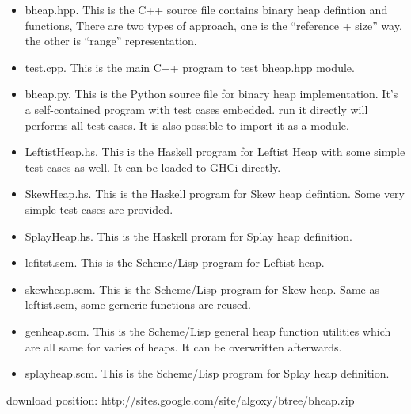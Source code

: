 \documentclass{article}
\begin{document}
\begin{itemize}
\item bheap.hpp. This is the C++ source file contains binary heap defintion and functions, There are two types of approach, one is the ``reference + size'' way, the other is ``range'' representation.

\item test.cpp. This is the main C++ program to test bheap.hpp module.

\item bheap.py. This is the Python source file for binary heap implementation. It's a self-contained program with test cases embedded. run it directly will performs all test cases. It is also possible to import it as a module.

\item LeftistHeap.hs. This is the Haskell program for Leftist Heap with some simple test cases as well. It can be loaded to GHCi directly.

\item SkewHeap.hs. This is the Haskell program for Skew heap defintion. Some very simple test cases are provided.

\item SplayHeap.hs. This is the Haskell proram for Splay heap definition.

\item lefitst.scm. This is the Scheme/Lisp program for Leftist heap.

\item skewheap.scm. This is the Scheme/Lisp program for Skew heap. Same as leftist.scm, some gerneric functions are reused.

\item genheap.scm. This is the Scheme/Lisp general heap function utilities which are all same for varies of heaps. It can be overwritten afterwards.

\item splayheap.scm. This is the Scheme/Lisp program for Splay heap definition.
\end{itemize}

download position: http://sites.google.com/site/algoxy/btree/bheap.zip
\end{document}
